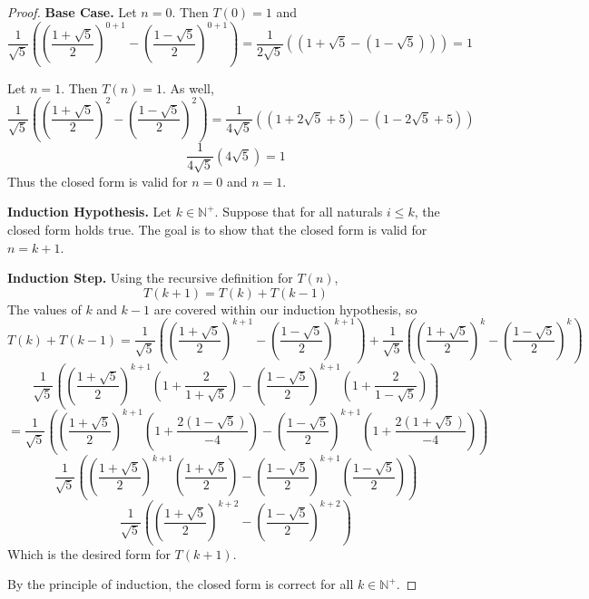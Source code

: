 \documentclass[11pt]{article}
\begin{document}
\begin{enumerate}[label=(\alph*)]
\begin{proof}
            \textbf{Base Case.} Let \(n=0\). Then \(T(0) = 1\) and
            \[
                \frac{1}{\sqrt{5}}\left(\left(\frac{1+\sqrt{5}}{2}\right)^{0+1} - \left(\frac{1-\sqrt{5}}{2}\right)^{0+1}\right) = \frac{1}{2\sqrt{5}}\left((1+\sqrt{5} - (1-\sqrt{5})) \right) = 1
            \]
            
            Let \(n=1\). Then \(T(n) = 1\). As well,
            \[
                \frac{1}{\sqrt{5}}\left(\left(\frac{1+\sqrt{5}}{2}\right)^{2} - \left(\frac{1-\sqrt{5}}{2}\right)^{2}\right) = \frac{1}{4\sqrt{5}}((1+2\sqrt{5} +5) - (1-2\sqrt{5} +5))
            \]
            \[
                \frac{1}{4\sqrt{5}}(4\sqrt{5}) = 1
            \]
            Thus the closed form is valid for \(n=0\) and \(n=1\).

            \textbf{Induction Hypothesis.} Let \(k \in \mathbb{N}^+\). Suppose that for all naturals \(i \leq k\), the closed form holds true. The goal is to show that the closed form is valid for \(n=k+1\).

            \textbf{Induction Step.} Using the recursive definition for \(T(n)\),
            \[
                T(k+1) = T(k) + T(k-1)
            \]
            The values of \(k\) and \(k-1\) are covered within our induction hypothesis, so
            \[
                T(k) + T(k-1) = \frac{1}{\sqrt{5}}\left(\left(\frac{1+\sqrt{5}}{2}\right)^{k+1} - \left(\frac{1-\sqrt{5}}{2}\right)^{k+1}\right) + \frac{1}{\sqrt{5}}\left(\left(\frac{1+\sqrt{5}}{2}\right)^{k} - \left(\frac{1-\sqrt{5}}{2}\right)^{k}\right)
            \]
            \[
                \frac{1}{\sqrt{5}}\left( \left(\frac{1+\sqrt{5}}{2}\right)^{k+1} \left( 1 + \frac{2}{1+\sqrt{5}}\right) - \left(\frac{1-\sqrt{5}}{2}\right)^{k+1} \left(1 + \frac{2}{1-\sqrt{5}} \right) \right)
            \]
            \[
                = \frac{1}{\sqrt{5}}\left( \left( \frac{1+\sqrt{5}}{2} \right)^{k+1} \left( 1 + \frac{2(1-\sqrt{5})}{-4} \right) - \left( \frac{1-\sqrt{5}}{2} \right)^{k+1} \left( 1 + \frac{2(1+\sqrt{5})}{-4}\right) \right)
            \]
            \[
                \frac{1}{\sqrt{5}}\left( \left( \frac{1+\sqrt{5}}{2} \right)^{k+1} \left(\frac{1+\sqrt{5}}{2} \right) - \left(\frac{1-\sqrt{5}}{2} \right)^{k+1} \left(\frac{1-\sqrt{5}}{2}\right)\right)
            \]
            \[
                \frac{1}{\sqrt{5}}\left( \left( \frac{1+\sqrt{5}}{2} \right)^{k+2} - \left(\frac{1-\sqrt{5}}{2} \right)^{k+2}\right)
            \]
            Which is the desired form for \(T(k+1)\).

            By the principle of induction, the closed form is correct for all \(k \in \mathbb{N}^+\).

        \end{proof}
    \end{enumerate}
\end{document}
